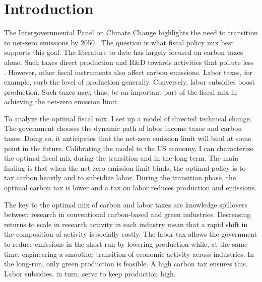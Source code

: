 \thispagestyle{empty}
\clearpage
\setcounter{page}{1}
\section{Introduction}




The Intergovernmental Panel on Climate Change highlights the need to transition to net-zero emissions by 2050 \citep{IPCC2022}. The question is what fiscal policy mix best supports this goal. The literature to date has largely focused on carbon taxes alone. Such taxes direct production and R\&D towards activities that pollute less \citep{Acemoglu2012TheChange}. However, other fiscal instruments also affect carbon emissions. Labor taxes, for example, curb the level of production generally. Conversely, labor subsidies  boost production. Such taxes may, thus, be an important part of the fiscal mix in achieving the  net-zero emission limit.

To analyze the optimal fiscal mix, I set up a model of directed technical change. The government chooses the dynamic path of labor income taxes and carbon taxes. Doing so, it anticipates that the net-zero emission limit will bind at some point in the future. Calibrating the model to the US economy, I can characterize the optimal fiscal mix during the transition and in the long term. The main finding is that when the net-zero emission limit binds, the optimal policy is to tax carbon heavily and to subsidize labor. During the transition phase, the optimal carbon tax is lower and a tax on labor reduces production and emissions. 

The key to the optimal mix of carbon and labor taxes are knowledge spillovers between research in conventional carbon-based and green industries. Decreasing returns to scale in research activity in each industry mean that a rapid shift in the composition of activity is socially costly. The labor tax allows the government to reduce emissions in the short run by lowering production while, at the same time, engineering a smoother transition of economic activity across industries. In the long-run, only green production is feasible. A high carbon tax ensures this. Labor subsidies, in turn, serve to keep production high.

